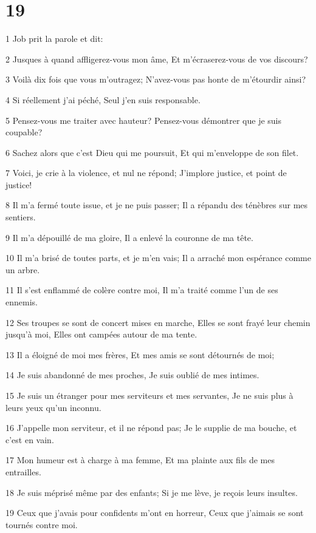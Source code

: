 \chapter{19}

\par 1 Job prit la parole et dit:
\par 2 Jusques à quand affligerez-vous mon âme, Et m'écraserez-vous de vos discours?
\par 3 Voilà dix fois que vous m'outragez; N'avez-vous pas honte de m'étourdir ainsi?
\par 4 Si réellement j'ai péché, Seul j'en suis responsable.
\par 5 Pensez-vous me traiter avec hauteur? Pensez-vous démontrer que je suis coupable?
\par 6 Sachez alors que c'est Dieu qui me poursuit, Et qui m'enveloppe de son filet.
\par 7 Voici, je crie à la violence, et nul ne répond; J'implore justice, et point de justice!
\par 8 Il m'a fermé toute issue, et je ne puis passer; Il a répandu des ténèbres sur mes sentiers.
\par 9 Il m'a dépouillé de ma gloire, Il a enlevé la couronne de ma tête.
\par 10 Il m'a brisé de toutes parts, et je m'en vais; Il a arraché mon espérance comme un arbre.
\par 11 Il s'est enflammé de colère contre moi, Il m'a traité comme l'un de ses ennemis.
\par 12 Ses troupes se sont de concert mises en marche, Elles se sont frayé leur chemin jusqu'à moi, Elles ont campées autour de ma tente.
\par 13 Il a éloigné de moi mes frères, Et mes amis se sont détournés de moi;
\par 14 Je suis abandonné de mes proches, Je suis oublié de mes intimes.
\par 15 Je suis un étranger pour mes serviteurs et mes servantes, Je ne suis plus à leurs yeux qu'un inconnu.
\par 16 J'appelle mon serviteur, et il ne répond pas; Je le supplie de ma bouche, et c'est en vain.
\par 17 Mon humeur est à charge à ma femme, Et ma plainte aux fils de mes entrailles.
\par 18 Je suis méprisé même par des enfants; Si je me lève, je reçois leurs insultes.
\par 19 Ceux que j'avais pour confidents m'ont en horreur, Ceux que j'aimais se sont tournés contre moi.
